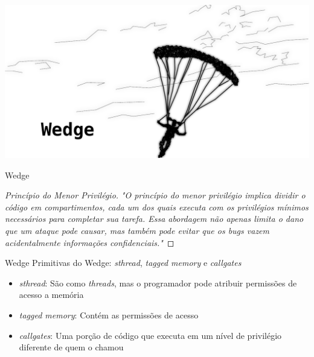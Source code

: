 \documentclass[xcolor={usenames,svgnames,dvipsnames},brazil,english,12pt,aspectratio=149]{beamer}
\begin{document}
\begin{frame}[plain]
  \includegraphics[width=\textwidth]{presentation_cap2_three}
\end{frame}

\begin{frame}{Wedge}

  \begin{proof}[Princípio do Menor Privilégio]

\emph{"O princípio do menor privilégio implica dividir o código em compartimentos,
cada um dos quais executa com os privilégios mínimos necessários para completar
sua tarefa. Essa abordagem não apenas limita o dano que um ataque pode causar,
mas também pode evitar que os \emph{bugs} vazem acidentalmente informações
confidenciais."}%

  \end{proof}

\end{frame}

\begin{frame}{Wedge}
  Primitivas do Wedge: \emph{sthread}, \emph{tagged memory} e \emph{callgates}
  \begin{itemize}
    \item \emph{sthread}: São como \emph{threads}, mas o programador pode atribuir permissões de acesso a memória
    \item \emph{tagged memory}: Contém as permissões de acesso
    \item \emph{callgates}: Uma porção de código que executa em um nível de privilégio diferente de quem o chamou
  \end{itemize}

\end{frame}

\end{document}
